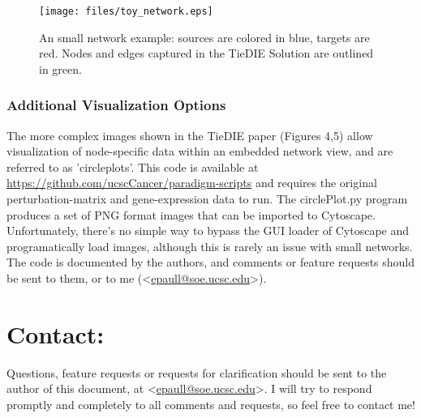 \documentclass[11pt]{report}
\newcommand{\emailaddr}[1]{\textless\url{#1}\textgreater}
\begin{document}
\begin{figure}[h]
    \texttt{[image: files/toy\_network.eps]}
	\caption{An small network example: sources are colored in blue, targets are red. Nodes and edges captured in the TieDIE Solution are outlined in green.}
    \label{fig:toy_network}
\end{figure}

\clearpage

\subsection{Additional Visualization Options}

The more complex images shown in the TieDIE paper (Figures 4,5) allow visualization of node-specific data within an embedded network view, 
and are referred to as 'circleplots'. 
This code is available at \url{https://github.com/ucscCancer/paradigm-scripts} and requires the original perturbation-matrix and gene-expression data to run. The circlePlot.py program produces a set of PNG format images that can be imported to Cytoscape. Unfortunately, there's no simple way to bypass the GUI loader of Cytoscape and programatically load images, although this is rarely an issue with small networks. The code is documented by the authors, and comments or feature requests should be sent to them, or to me (\emailaddr{epaull@soe.ucsc.edu}). 

\chapter{Contact:}

Questions, feature requests or requests for clarification should be sent to the author of this document, at \emailaddr{epaull@soe.ucsc.edu}. I will try to respond promptly and completely to all comments and requests, so feel free to contact me!
 

\end{document}
